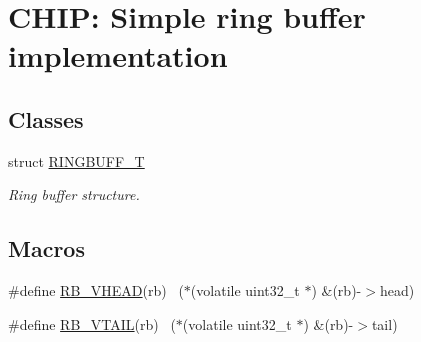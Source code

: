 \hypertarget{group__Ring__Buffer}{}\section{C\+H\+IP\+: Simple ring buffer implementation}
\label{group__Ring__Buffer}
\subsection*{Classes}
\begin{DoxyCompactItemize}
\item 
struct \hyperlink{structRINGBUFF__T}{R\+I\+N\+G\+B\+U\+F\+F\+\_\+T}
\begin{DoxyCompactList}\small\item\em Ring buffer structure. \end{DoxyCompactList}\end{DoxyCompactItemize}
\subsection*{Macros}
\begin{DoxyCompactItemize}
\item 
\#define \hyperlink{group__Ring__Buffer_gac57566080a5b678cadadd984584911ba}{R\+B\+\_\+\+V\+H\+E\+AD}(rb)                        ~($\ast$(volatile uint32\+\_\+t $\ast$) \&(rb)-\/$>$head)
\item 
\#define \hyperlink{group__Ring__Buffer_ga8beb68e25adc2ca5aa31abd682e34c9d}{R\+B\+\_\+\+V\+T\+A\+IL}(rb)                        ~($\ast$(volatile uint32\+\_\+t $\ast$) \&(rb)-\/$>$tail)
\end{DoxyCompactItemize}

